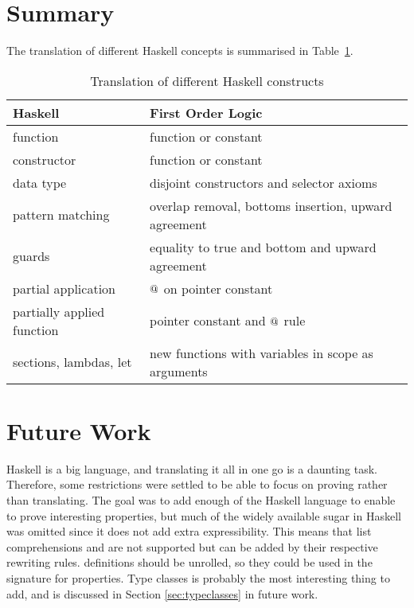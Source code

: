 \section{Summary}

The translation of different Haskell concepts is summarised in
Table~\ref{tab:transtable}.

\begin{table}[h]
  \centering
  \begin{tabular}{|l|l|}
    \hline
    Haskell                    & First Order Logic \\
    \hline
    function                   & function or constant \\
    constructor                & function or constant \\
    data type                  & disjoint constructors and selector axioms \\
    pattern matching           & overlap removal, bottoms insertion, upward agreement \\
    guards                     & equality to true and bottom and upward agreement \\
    partial application        & $@$ on pointer constant \\
    partially applied function & pointer constant and $@$ rule \\
    sections, lambdas, let     & new functions with variables in scope as arguments \\
    \hline
  \end{tabular}
  \caption{Translation of different Haskell constructs
    \label{tab:transtable}
  }
\end{table}

%






\section{Future Work}

Haskell is a big language, and translating it all in one go is a
daunting task. Therefore, some restrictions were settled to be able to
focus on proving rather than translating.  The goal was to add enough
of the Haskell language to enable to prove interesting properties, but
much of the widely available sugar in Haskell was omitted since it
does not add extra expressibility. This means that list comprehensions
and are not supported but can be added by their respective rewriting
rules.  definitions should be unrolled, so they could be
used in the signature for properties. Type classes is probably the
most interesting thing to add, and is discussed in Section
\ref{sec:typeclasses} in future work.

